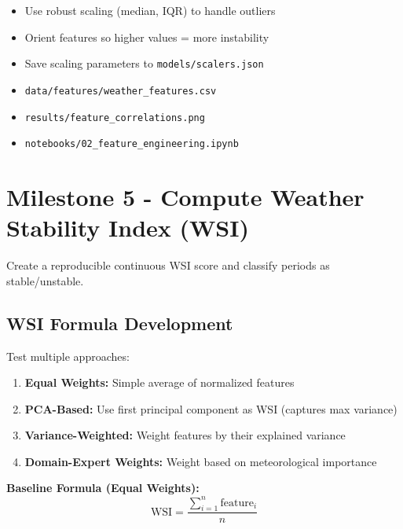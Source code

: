 \documentclass[11pt,a4paper]{article}
\begin{document}
\begin{itemize}
    \item Use robust scaling (median, IQR) to handle outliers
    \item Orient features so higher values = more instability
    \item Save scaling parameters to \texttt{models/scalers.json}
\end{itemize}

\begin{deliverablebox}
\begin{itemize}
    \item \texttt{data/features/weather\_features.csv}
    \item \texttt{results/feature\_correlations.png}
    \item \texttt{notebooks/02\_feature\_engineering.ipynb}
\end{itemize}
\end{deliverablebox}

\section{Milestone 5 - Compute Weather Stability Index (WSI)}

\begin{objectivebox}
Create a reproducible continuous WSI score and classify periods as stable/unstable.
\end{objectivebox}

\subsection{WSI Formula Development}

Test multiple approaches:
\begin{enumerate}
    \item \textbf{Equal Weights:} Simple average of normalized features
    
    \item \textbf{PCA-Based:} Use first principal component as WSI (captures max variance)
    
    \item \textbf{Variance-Weighted:} Weight features by their explained variance
    
    \item \textbf{Domain-Expert Weights:} Weight based on meteorological importance
\end{enumerate}

\textbf{Baseline Formula (Equal Weights):}
\begin{equation}
\text{WSI} = \frac{\sum_{i=1}^{n} \text{feature}_i}{n}
\end{equation}
\end{document}
